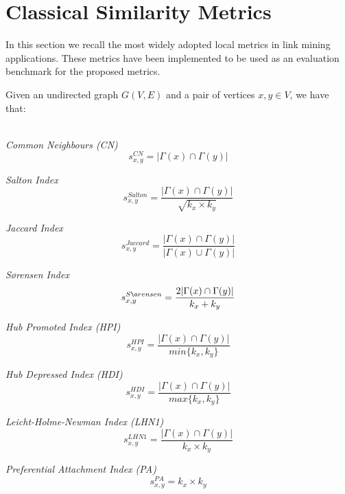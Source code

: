 \section{Classical Similarity Metrics}
\label{sec:metrics}
In this section we recall the most widely adopted local metrics in link mining applications.
These metrics have been implemented to be used as an evaluation benchmark for the proposed metrics.

Given an undirected graph $G(V,E)$ and a pair of vertices $x,y\in V$, we have that:

\noindent\\
\textit{Common Neighbours (CN)}
\begin{equation}
\label{eqn:common-neighbours}
s^{CN}_{x,y}= |\Gamma(x) \cap \Gamma(y)|
\end{equation}

\noindent
\textit{Salton Index}
\begin{equation}
\label{eqn:salton}
s^{Salton}_{x,y}=
\frac{ |\Gamma(x) \cap \Gamma(y)|}{\sqrt{k_{x} \times k_{y}}}
\end{equation}

\noindent
\textit{Jaccard Index}
\begin{equation}
\label{eqn:jaccard}
s^{Jaccard}_{x,y}=
\frac{|\Gamma(x) \cap \Gamma(y)|}{|\Gamma(x) \cup \Gamma(y)|}
\end{equation}

\noindent
\textit{S\o rensen Index}
\begin{equation}
\label{eqn:sorensen}
s^{S\o rensen}_{x,y}=
\frac{2|\Gamma(x) \cap \Gamma(y)|}{k_{x} + k_{y}}
\end{equation}

\noindent
\textit{Hub Promoted Index (HPI)}
\begin{equation}
\label{eqn:hpi}
s^{HPI}_{x,y}=
\frac{|\Gamma(x) \cap \Gamma(y)|}{min\{k_{x},k_{y}\}}
\end{equation}

\noindent
\textit{Hub Depressed Index (HDI)}
\begin{equation}
\label{eqn:hdi}
s^{HDI}_{x,y}=
\frac{|\Gamma(x) \cap \Gamma(y)|}{max\{k_{x},k_{y}\}}
\end{equation}

\noindent
\textit{Leicht-Holme-Newman Index (LHN1)}
\begin{equation}
\label{eqn:lhn1}
s^{LHN1}_{x,y}=
\frac{|\Gamma(x) \cap \Gamma(y)|}{k_{x} \times k_{y}}
\end{equation}

\noindent
\textit{Preferential Attachment Index (PA)}
\begin{equation}
\label{eqn:pa}
s^{PA}_{x,y}= k_{x} \times k_{y}
\end{equation}

